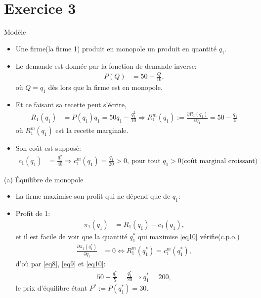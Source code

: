\section{Exercice 3}
\frame{\sectionpage}
\begin{frame}[allowframebreaks]{Modèle}
\begin{itemize}
\item Une firme(la firme 1) produit en monopole un produit en quantité $q_1$.
\item Le demande est donnée par la fonction de demande inverse: 
\begin{align*}
    P(Q) &= 50 - \frac{Q}{10}, 
\end{align*}
où $Q = q_1$ dès lors que la firme est en monopole.
\item Et ce faisant sa recette peut s'écrire,
\begin{align}
    R_1(q_1) &= P(q_1)q_1 = 50q_1- \frac{q_1^2}{10} \Rightarrow R^m_1(q_1) := \frac{\partial R_1(q_1)}{\partial q_1} = 50-\frac{q_1}{5}
\label{eq8}
\end{align}
où $R^m_1(q_1)$ est la recette marginale.
\item Son coût est supposé:
\begin{align}
    c_1(q_1) &= \frac{q_1^2}{40} \Rightarrow c^m_1(q_1) = \frac{q_1}{20} > 0, \ \text{pour tout \ $q_1>0$(coût marginal croissant)}
\label{eq9}
\end{align}
\end{itemize}
    \end{frame}

    \begin{frame}[allowframebreaks]{(a) Équilibre de monopole}
        \begin{itemize}
            \item La firme maximise son profit qui ne dépend que de $q_1$:
            \item Profit de 1: 
            \begin{align}
                \pi_1(q_1) &=R_1(q_1) - c_1(q_1),
                \label{eq10}
            \end{align}
            et il est facile de voir que la quantité $q_1^*$ qui maximise \eqref{eq10} vérifie(c.p.o.)
            \begin{align}
                \frac{\partial \pi_1(q_1^*)}{\partial q_1} &= 0 \Leftrightarrow  R^m_1(q_1^*) = c^m_1(q_1^*),
                \label{eq11}
            \end{align}
            d'où par \eqref{eq8}, \eqref{eq9} et \eqref{eq10}:
            \begin{align*}
                 50-\frac{q_1^*}{5}=\frac{q_1^*}{20} \Rightarrow q_1^* = 200,
            \end{align*}
            le prix d'équilibre étant $P^* := P(q_1^*) = 30$.
        \end{itemize}
    \end{frame}   


